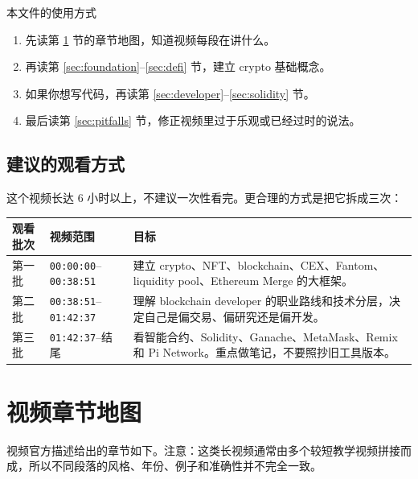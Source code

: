 \documentclass[UTF8,11pt]{ctexart}
\newcommand{\timestamp}[1]{\textcolor{blue!50!black}{\texttt{#1}}}
\begin{document}
\begin{keybox}{本文件的使用方式}
\begin{enumerate}
  \item 先读第 \ref{sec:map} 节的章节地图，知道视频每段在讲什么。
  \item 再读第 \ref{sec:foundation}--\ref{sec:defi} 节，建立 crypto 基础概念。
  \item 如果你想写代码，再读第 \ref{sec:developer}--\ref{sec:solidity} 节。
  \item 最后读第 \ref{sec:pitfalls} 节，修正视频里过于乐观或已经过时的说法。
\end{enumerate}
\end{keybox}

\subsection{建议的观看方式}

这个视频长达 \(6\) 小时以上，不建议一次性看完。更合理的方式是把它拆成三次：

\begin{longtable}{>{\raggedright\arraybackslash}p{3cm}>{\raggedright\arraybackslash}p{4.3cm}>{\raggedright\arraybackslash}p{7cm}}
\toprule
\textbf{观看批次} & \textbf{视频范围} & \textbf{目标} \\
\midrule
\endhead
第一批 & \timestamp{00:00:00}--\timestamp{00:38:51} & 建立 crypto、NFT、blockchain、CEX、Fantom、liquidity pool、Ethereum Merge 的大框架。 \\
第二批 & \timestamp{00:38:51}--\timestamp{01:42:37} & 理解 blockchain developer 的职业路线和技术分层，决定自己是偏交易、偏研究还是偏开发。 \\
第三批 & \timestamp{01:42:37}--结尾 & 看智能合约、Solidity、Ganache、MetaMask、Remix 和 Pi Network。重点做笔记，不要照抄旧工具版本。 \\
\bottomrule
\end{longtable}

\section{视频章节地图}
\label{sec:map}

视频官方描述给出的章节如下。注意：这类长视频通常由多个较短教学视频拼接而成，所以不同段落的风格、年份、例子和准确性并不完全一致。
\end{document}
